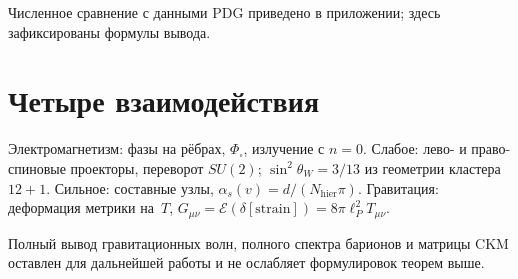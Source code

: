 Численное сравнение с данными PDG приведено в приложении; здесь зафиксированы формулы вывода.

\section{Четыре взаимодействия}

\begin{proposition}
Электромагнетизм: фазы на рёбрах, $\Phi_\square$, излучение с $n=0$.
Слабое: лево- и право-спиновые проекторы, переворот $SU(2)$; $\sin^2\theta_W=3/13$
из геометрии кластера $12+1$.
Сильное: составные узлы, $\alpha_s(v)=d/(N_{\mathrm{hier}}\pi)$.
Гравитация: деформация метрики на~$T$,
$G_{\mu\nu}=\mathcal{E}(\delta[\mathrm{strain}])=8\pi\ell_P^2 T_{\mu\nu}$.
\end{proposition}

Полный вывод гравитационных волн, полного спектра барионов и матрицы CKM
оставлен для дальнейшей работы и не ослабляет формулировок теорем выше.
